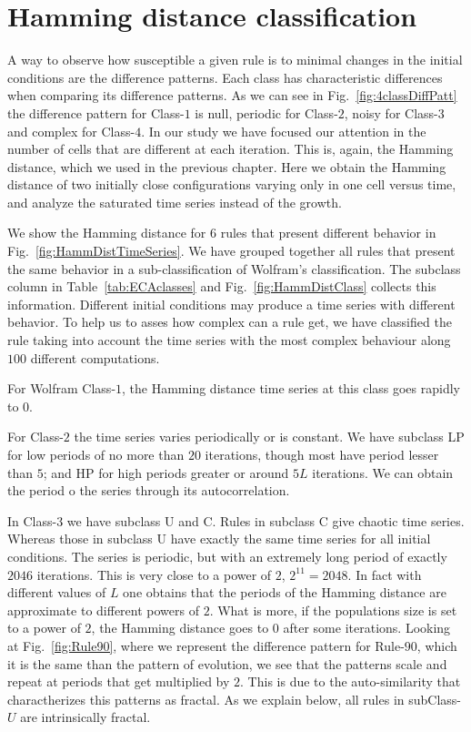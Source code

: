 \section{Hamming distance classification}

A way to observe how susceptible a given rule is to minimal changes in the initial conditions are the difference patterns. Each class has characteristic differences when comparing its difference patterns. As we can see in Fig.~\ref{fig:4classDiffPatt} the difference pattern for Class-$1$ is null, periodic for Class-$2$, noisy for Class-$3$ and complex for Class-$4$. In our study we have focused our attention in the number of cells that are different at each iteration. This is, again, the Hamming distance, which we used in the previous chapter. Here we obtain the Hamming distance of two initially close configurations varying only in one cell versus time, and analyze the saturated time series instead of the growth. 


We show the Hamming distance for $6$ rules that present different behavior in Fig.~\ref{fig:HammDistTimeSeries}. We have grouped together all rules that present the same behavior in a sub-classification of Wolfram's classification. The subclass column in Table~\ref{tab:ECAclasses} and Fig.~\ref{fig:HammDistClass} collects this information. Different initial conditions may produce a time series with different behavior. To help us to asses how complex can a rule get, we have classified the rule taking into account the time series with the most complex behaviour along $100$ different computations.

For Wolfram Class-$1$, the Hamming distance time series at this class goes rapidly to $0$. 

For Class-$2$ the time series varies periodically or is constant. We have subclass LP for low periods of no more than $20$ iterations, though most have period lesser than $5$; and HP for high periods greater or around $5L$ iterations. We can obtain the period o the series through its autocorrelation.

In Class-$3$ we have subclass U and C. Rules in subclass C give chaotic time series. Whereas those in subclass U have exactly the same time series for all initial conditions. The series is periodic, but with an extremely long period of exactly $2046$ iterations. This is very close to a power of $2$, $2^11 = 2048$. In fact with different values of $L$ one obtains that the periods of the Hamming distance are approximate to different powers of $2$. What is more, if the populations size is set to a power of $2$, the Hamming distance goes to $0$ after some iterations. Looking at Fig.~\ref{fig:Rule90}, where we represent the difference pattern for Rule-$90$, which it is the same than the pattern of evolution, we see that the patterns scale and repeat at periods that get multiplied by $2$. This is due to the auto-similarity that charactherizes this patterns as fractal.
As we explain below, all rules in subClass-$U$ are intrinsically fractal.




